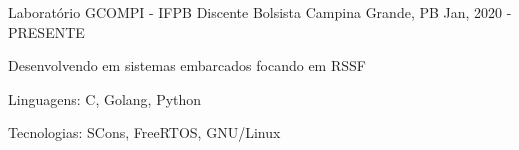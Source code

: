 \begin{cventries}
  \cventry
  {Laboratório GCOMPI - IFPB} %
  {Discente Bolsista} %
  {Campina Grande, PB} %
  {Jan, 2020 - PRESENTE} %
  {
    \begin{cvitems} %
      \item {Desenvolvendo em sistemas embarcados focando em RSSF}
      \item {Linguagens: C, Golang, Python}
      \item {Tecnologias: SCons, FreeRTOS, GNU/Linux}
    \end{cvitems}
  }
\end{cventries}
